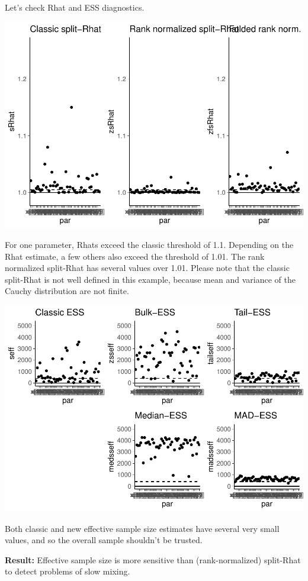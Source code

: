 \documentclass[american,]{article}
\begin{document}
Let's check Rhat and ESS diagnostics.

\includegraphics{graphics/rhat-fit-nom-1.pdf}

For one parameter, Rhats exceed the classic threshold of 1.1. Depending
on the Rhat estimate, a few others also exceed the threshold of 1.01.
The rank normalized split-Rhat has several values over 1.01. Please note
that the classic split-Rhat is not well defined in this example, because
mean and variance of the Cauchy distribution are not finite.

\includegraphics{graphics/ess-fit-nom-1.pdf}

Both classic and new effective sample size estimates have several very
small values, and so the overall sample shouldn't be trusted.

\textbf{Result:} Effective sample size is more sensitive than
(rank-normalized) split-Rhat to detect problems of slow mixing.
\end{document}
